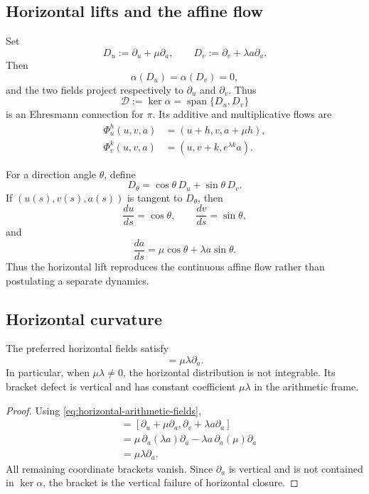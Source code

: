 \subsection{Horizontal lifts and the affine flow}

Set
\begin{equation}
    D_u:=\partial_u+\mu\partial_a,
    \qquad
    D_v:=\partial_v+\lambda a\partial_a.
    \label{eq:horizontal-arithmetic-fields}
\end{equation}
Then
\[
    \alpha(D_u)=\alpha(D_v)=0,
\]
and the two fields project respectively to \(\partial_u\) and \(\partial_v\).
Thus
\[
    \mathcal D:=\ker\alpha
       =\operatorname{span}\{D_u,D_v\}
\]
is an Ehresmann connection for \(\pi\).  Its additive and multiplicative flows
are
\begin{align}
    \Phi_u^h(u,v,a)&=(u+h,v,a+\mu h),
       \label{eq:additive-horizontal-flow}\\
    \Phi_v^k(u,v,a)&=(u,v+k,e^{\lambda k}a).
       \label{eq:multiplicative-horizontal-flow}
\end{align}

For a direction angle \(\theta\), define
\[
    D_\theta=\cos\theta\,D_u+\sin\theta\,D_v.
\]
If \((u(s),v(s),a(s))\) is tangent to \(D_\theta\), then
\[
    \frac{du}{ds}=\cos\theta,
    \qquad
    \frac{dv}{ds}=\sin\theta,
\]
and
\begin{equation}
    \frac{da}{ds}
       =\mu\cos\theta+\lambda a\sin\theta.
    \label{eq:contact-realizes-affine-flow}
\end{equation}
Thus the horizontal lift reproduces the continuous affine flow rather than
postulating a separate dynamics.

\subsection{Horizontal curvature}

\begin{theorem}
\label{thm:contact-curvature}
The preferred horizontal fields satisfy
\begin{equation}
    [D_u,D_v]=\mu\lambda\partial_a.
    \label{eq:horizontal-curvature-bracket}
\end{equation}
In particular, when \(\mu\lambda\ne0\), the horizontal distribution is not
integrable.  Its bracket defect is vertical and has constant coefficient
\(\mu\lambda\) in the arithmetic frame.
\end{theorem}

\begin{proof}
Using \eqref{eq:horizontal-arithmetic-fields},
\begin{align*}
    [D_u,D_v]
      &=[\partial_u+\mu\partial_a,
          \partial_v+\lambda a\partial_a]\\
      &=\mu\,\partial_a(\lambda a)\partial_a
        -\lambda a\,\partial_a(\mu)\partial_a\\
      &=\mu\lambda\partial_a.
\end{align*}
All remaining coordinate brackets vanish.  Since \(\partial_a\) is vertical
and is not contained in \(\ker\alpha\), the bracket is the vertical failure of
horizontal closure.
\end{proof}

